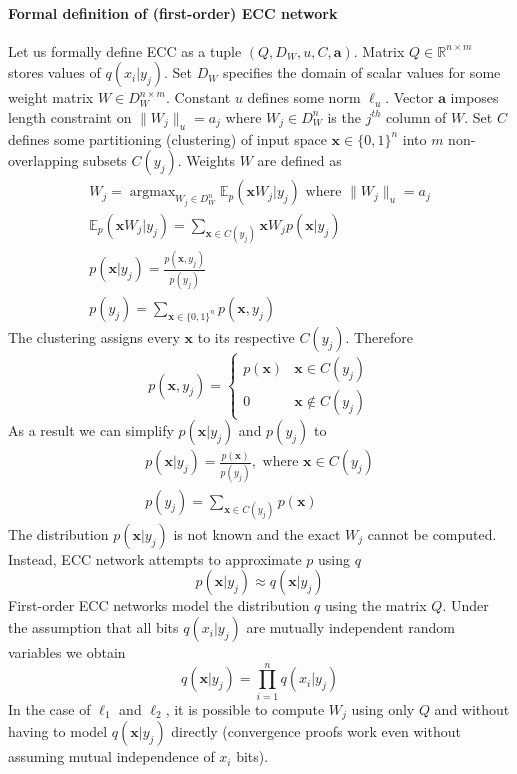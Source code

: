 \documentclass[12pt]{article}
\DeclareMathOperator*{\argmax}{argmax}
\begin{document}
\paragraph{Formal definition of (first-order) ECC network}
Let us formally define ECC as a tuple $(Q,D_W,u,C,\boldsymbol{a})$. Matrix $Q\in \mathbb{R}^{n\times m}$ stores values of $q(x_i|y_j)$. Set $D_W$ specifies the domain of scalar values for some weight matrix $W\in D_W^{n \times m}$. Constant $u$ defines some norm $\ell_u$.  Vector $\boldsymbol{a}$ imposes length constraint on $\lVert W_j \rVert_u=a_j$ where $W_j\in D_W^n$ is the $j^{th}$ column of $W$. Set $C$ defines some partitioning (clustering) of input space $\boldsymbol{x}\in \{0,1\}^n$ into $m$ non-overlapping subsets $C(y_j) $.
Weights $W$ are defined as
\begin{gather*}
	W_j = \argmax_{W_j\in D_W^{n}} \mathbb{E}_p(\boldsymbol{x}W_j|y_j)\text{ where } \lVert W_j \rVert_u=a_j \\
	\mathbb{E}_p(\boldsymbol{x}W_j|y_j) = \sum_{\boldsymbol{x}\in C(y_j)}\boldsymbol{x}W_jp(\boldsymbol{x}|y_j) \\ 
	p(\boldsymbol{x}|y_j) = \frac{p(\boldsymbol{x},y_j)}{p(y_j)} \\
	p(y_j) =  \sum_{\boldsymbol{x}\in \{0,1\}^n}p(\boldsymbol{x},y_j)
\end{gather*}
The clustering assigns every $\boldsymbol{x}$ to its respective $C(y_j)$. Therefore 
\[
p(\boldsymbol{x},y_j) = \begin{cases}
	p(\boldsymbol{x}) & \boldsymbol{x} \in C(y_j) \\
	0 & \boldsymbol{x} \notin C(y_j)
\end{cases}
\]
As a result we can simplify $p(\boldsymbol{x}|y_j)$ and $p(y_j)$ to
\begin{gather*}
p(\boldsymbol{x}|y_j) = \frac{p(\boldsymbol{x})}{p(y_j)}, \text{ where  }\boldsymbol{x} \in C(y_j)\\
p(y_j) =  \sum_{\boldsymbol{x}\in C(y_j)}p(\boldsymbol{x})
\end{gather*}
The distribution $p(\boldsymbol{x}|y_j)$ is not known and the exact $W_j$ cannot be computed. Instead, ECC network attempts to approximate $p$ using $q$ 
\[
p(\boldsymbol{x}|y_j) \approx q(\boldsymbol{x}|y_j)
\]
First-order ECC networks model the distribution $q$ using the matrix $Q$. 
Under the assumption that all bits $q(x_i|y_j)$ are mutually independent random variables we obtain
\[
q(\boldsymbol{x}|y_j) = \prod_{i=1}^n q(x_i|y_j)
\]
In the case of $\ell_1$ and $\ell_2$, it is possible to compute $W_j$ using only  $Q$ and without having to model $q(\boldsymbol{x}|y_j)$ directly (convergence proofs work even without assuming mutual independence of $x_i$ bits).
\end{document}
